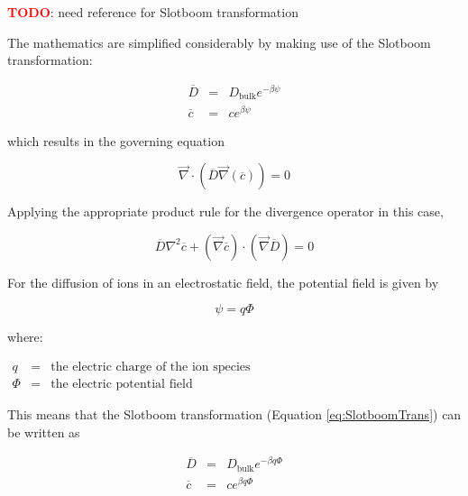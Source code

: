 \textcolor{red}{\textbf{TODO}}: need reference for Slotboom transformation

The mathematics are simplified considerably by making use of the Slotboom transformation:

\begin{equation}\label{eq:SlotboomTrans}
\begin{array}{rcl}
\overline{D} & = & D_{\mathrm{bulk}} e^{-\beta \psi} \\
\overline{c} & = & c e^{\beta \psi}
\end{array}
\end{equation}

which results in the governing equation

\begin{equation}
\vec{\nabla} \cdot \left( \overline{D} \vec{\nabla} \left( \overline{c} \right) \right) = 0
\end{equation}

Applying the appropriate product rule for the divergence operator in this case,

\begin{equation}\label{eq:SmolSlotboomDiff}
\overline{D} \nabla^2 \overline{c} + \left( \vec{\nabla} \overline{c} \right) \cdot \left( \vec{\nabla} \overline{D} \right) = 0
\end{equation}

For the diffusion of ions in an electrostatic field, the potential field is given by

\begin{equation}
\psi=q \Phi
\end{equation}

where:

$\begin{array}{rcl}
q & = & \text{the electric charge of the ion species} \\
\Phi & = & \text{the electric potential field}
\end{array}$

This means that the Slotboom transformation (Equation \ref{eq:SlotboomTrans}) can be written as

\begin{equation}\label{eq:SlotboomTransWithQ}
\begin{array}{rcl}
\overline{D} & = & D_{\mathrm{bulk}} e^{-\beta q \Phi} \\
\overline{c} & = & c e^{\beta q \Phi}
\end{array}
\end{equation}

